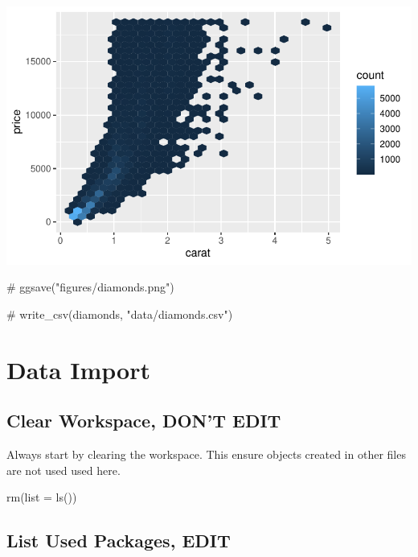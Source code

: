 \documentclass[
  letterpaper,
  DIV=11,
  numbers=noendperiod]{scrreprt}
\newenvironment{Shaded}{\begin{snugshade}}{\end{snugshade}}
\newcommand{\AttributeTok}[1]{\textcolor[rgb]{0.40,0.45,0.13}{#1}}
\newcommand{\CommentTok}[1]{\textcolor[rgb]{0.37,0.37,0.37}{#1}}
\newcommand{\FunctionTok}[1]{\textcolor[rgb]{0.28,0.35,0.67}{#1}}
\newcommand{\NormalTok}[1]{\textcolor[rgb]{0.00,0.23,0.31}{#1}}
\begin{document}
\includegraphics{src/r-for-data-science/06-workflow-scripts-and-projects_files/figure-pdf/unnamed-chunk-3-1.pdf}

\begin{Shaded}
\begin{Highlighting}[]
\CommentTok{\# ggsave("figures/diamonds.png")}

\CommentTok{\# write\_csv(diamonds, "data/diamonds.csv")}
\end{Highlighting}
\end{Shaded}

\chapter{Data Import}\label{data-import}

\section*{Clear Workspace, DON'T
EDIT}\label{clear-workspace-dont-edit-8}


Always start by clearing the workspace. This ensure objects created in
other files are not used used here.

\begin{Shaded}
\begin{Highlighting}[]
\FunctionTok{rm}\NormalTok{(}\AttributeTok{list =} \FunctionTok{ls}\NormalTok{())}
\end{Highlighting}
\end{Shaded}

\section*{List Used Packages, EDIT}\label{list-used-packages-edit-8}
\end{document}
